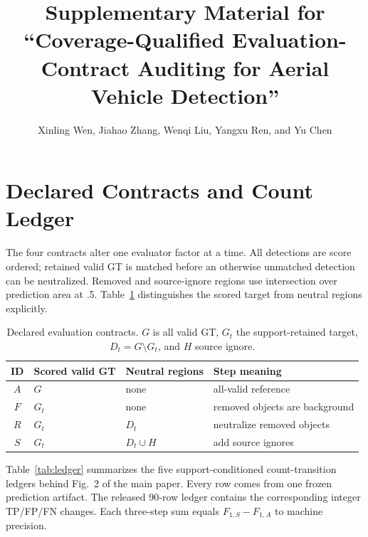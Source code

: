 \documentclass[journal]{IEEEtran}
\title{Supplementary Material for ``Coverage-Qualified Evaluation-Contract Auditing for Aerial Vehicle Detection''}
\author{Xinling Wen, Jiahao Zhang, Wenqi Liu, Yangxu Ren, and Yu Chen}
\begin{document}
\maketitle
\renewcommand{\thesection}{S\arabic{section}}
\renewcommand{\thetable}{S\arabic{table}}
\setcounter{page}{1}

\section{Declared Contracts and Count Ledger}
The four contracts alter one evaluator factor at a time. All detections are score ordered; retained valid GT is matched before an otherwise unmatched detection can be neutralized. Removed and source-ignore regions use intersection over prediction area at .5. Table~\ref{tab:contracts} distinguishes the scored target from neutral regions explicitly.

\begin{table}[!t]
\centering
\caption{Declared evaluation contracts. $G$ is all valid GT, $G_t$ the support-retained target, $D_t=G\setminus G_t$, and $H$ source ignore.}\label{tab:contracts}
\scriptsize
\setlength{\tabcolsep}{1.8pt}\renewcommand{\arraystretch}{1.05}
\begin{tabular}{clll}
\toprule
ID & Scored valid GT & Neutral regions & Step meaning\\
\midrule
$A$ & $G$ & none & all-valid reference\\
$F$ & $G_t$ & none & removed objects are background\\
$R$ & $G_t$ & $D_t$ & neutralize removed objects\\
$S$ & $G_t$ & $D_t\cup H$ & add source ignores\\
\bottomrule
\end{tabular}
\end{table}

Table~\ref{tab:ledger} summarizes the five support-conditioned count-transition ledgers behind Fig.~2 of the main paper. Every row comes from one frozen prediction artifact. The released 90-row ledger contains the corresponding integer TP/FP/FN changes. Each three-step sum equals $F_{1,S}-F_{1,A}$ to machine precision.
\end{document}
